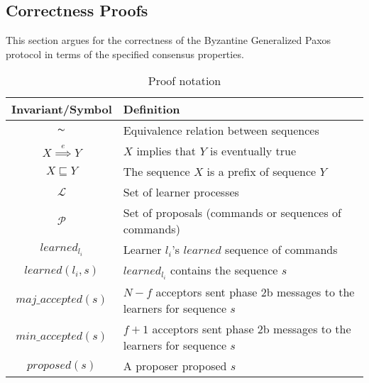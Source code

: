 \subsection{Correctness Proofs}

This section argues for the correctness of the Byzantine Generalized Paxos protocol in terms of the specified consensus properties.\par


\begin{table}[h!]
	\renewcommand{\arraystretch}{1.5}
	\centering
	\begin{tabularx}{\linewidth}{ |c|X|}
		\hline
		Invariant/Symbol & Definition \\
		\hline
		$\thicksim$ & Equivalence relation between sequences \\
		\hline
		$X \overset{e}{\implies} Y$ & $X$ implies that $Y$ is eventually true \\
		\hline
		$X \sqsubseteq Y$ & The sequence $X$ is a prefix of sequence $Y$ \\
		\hline
		$\mathcal{L}$ & Set of learner processes \\
		\hline
		$\mathcal{P}$ & Set of proposals (commands or sequences of commands) \\
		\hline
		$learned_{l_i}$ & Learner $l_i$'s $learned$ sequence of commands \\
		\hline
		$learned(l_i,s)$ & $learned_{l_i}$ contains the sequence $s$ \\
		\hline
		$maj\_accepted(s)$ & $N-f$ acceptors sent phase 2b messages to the learners for sequence $s$ \\
		\hline
		$min\_accepted(s)$ & $f+1$ acceptors sent phase 2b messages to the learners for sequence $s$ \\
		\hline
		$proposed(s)$ & A proposer proposed $s$ \\
		\hline
		
	\end{tabularx} 
	\caption{Proof notation} 
	\label{table:1}
\end{table}

